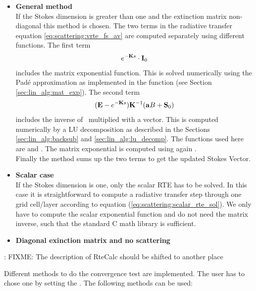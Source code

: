 \begin{itemize}
\item {\bf General method}\\
  If the Stokes dimension is greater than one and the extinction
  matrix non-diagonal this method is chosen.  The two terms in the
  radiative transfer equation \ref{eq:scattering:vrte_fs_av} are
  computed separately using different functions. The first term
\begin{equation}
 e^{-{\bf K} s}\cdot{\bf I}_0
\end{equation}
includes the matrix exponential function. This is solved numerically
using the Pad\'e approximation as implemented in the function
 (see Section \ref{sec:lin_alg:mat_exp}).  The
second term
\begin{equation}
({\bf E} - e^{-{\bf K}
    s}) {\bf K}^{-1} ({\bf a} B + {\bf S}_0)
\end{equation}
includes the inverse of \ExtMat\ multiplied with a vector. This is
computed numerically by a LU decomposition as described in the
Sections \ref{sec:lin_alg:backsub} and \ref{sec:lin_alg:lu_decomp}.
The functions used here are  and
. The matrix exponential is
computed using again .\\
Finally the method sums up the two terms to get the updated Stokes
Vector.
 
\item {\bf Scalar case}\\
  If the Stokes dimension is one, only the scalar RTE has to be
  solved.  In this case it is straightforward to compute a radiative
  transfer step through one grid cell/layer according to equation
  (\ref{eq:scattering:scalar_rte_sol}). We only have to compute the
  scalar exponential function and do not need the matrix inverse, such
  that the standard C math library is sufficient.

  
\item{\bf Diagonal exinction matrix and no scattering}
\end{itemize}
{\Large: FIXME: The description of RteCalc should be shifted to
  another place}


\label{sec:scattering:conv_method}

Different methods to do the convergence test are implemented. The user
has to chose one by setting the .
The following methods can be used:


